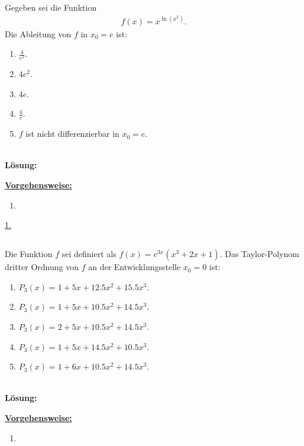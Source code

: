 \newpage
\subsection*{}
Gegeben sei die Funktion
\begin{align*}
	f(x) = x^{\ln(x^2)}.
\end{align*}
Die Ableitung von $f$ in $x_0 = e $ ist:
\renewcommand{\labelenumi}{(\alph{enumi})}
\begin{enumerate}
	\item 
	$ \frac{4}{e^2}$.
	\item
	$ 4 e^2 $.
	\item
	$ 4 e $.
	\item
	$ \frac{4}{e} $.
	\item
	$f$ ist nicht differenzierbar in $x_0 = e$.
\end{enumerate}
\ \\
\textbf{Lösung:}
\begin{mdframed}
\underline{\textbf{Vorgehensweise:}}
\renewcommand{\labelenumi}{\theenumi.}
\begin{enumerate}
\item 
\end{enumerate}
\end{mdframed}
\underline{1. }\\

\newpage
\subsection*{}
Die Funktion $f$ sei definiert als $f(x) = e^{3x} (x^3 +2x +1)$. 
Das Taylor-Polynom dritter Ordnung von $f$ an der Entwicklungsstelle $x_0 = 0$ ist:
\renewcommand{\labelenumi}{(\alph{enumi})}
\begin{enumerate}
	\item 
	$P_3(x) = 1 + 5x + 12.5 x^2 + 15.5 x^3 $.
	\item 
	$P_3(x) = 1 + 5x + 10.5 x^2 + 14.5 x^3 $.
	\item
	$P_3(x) = 2 + 5x + 10.5 x^2 + 14.5 x^3 $.
	\item
	$P_3(x) = 1 + 5x + 14.5 x^2 + 10.5 x^3 $.
	\item
	$P_3(x) = 1 + 6x + 10.5 x^2 + 14.5 x^3 $.
\end{enumerate}
\ \\
\textbf{Lösung:}
\begin{mdframed}
\underline{\textbf{Vorgehensweise:}}
\renewcommand{\labelenumi}{\theenumi.}
\begin{enumerate}
\item 

\end{enumerate}
\end{mdframed}

